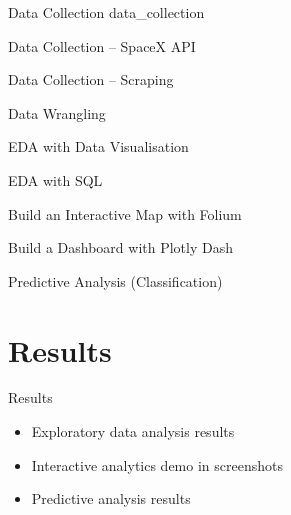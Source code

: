 \begin{frame}{Data Collection}
    {data_collection}
\end{frame}

\begin{frame}{Data Collection -- SpaceX API}

\end{frame}

\begin{frame}{Data Collection -- Scraping}

\end{frame}

\begin{frame}{Data Wrangling}

\end{frame}

\begin{frame}{EDA with Data Visualisation}

\end{frame}

\begin{frame}{EDA with SQL}

\end{frame}

\begin{frame}{Build an Interactive Map with Folium}

\end{frame}

\begin{frame}{Build a Dashboard with Plotly Dash}

\end{frame}

\begin{frame}{Predictive Analysis (Classification)}

\end{frame}

\section{Results}

\begin{frame}{Results}
    \begin{itemize}
        \item Exploratory data analysis results
        \item Interactive analytics demo in screenshots
        \item Predictive analysis results
    \end{itemize}
\end{frame}


